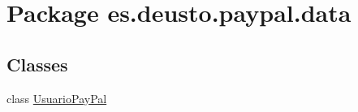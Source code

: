 \hypertarget{namespacees_1_1deusto_1_1paypal_1_1data}{}\section{Package es.\+deusto.\+paypal.\+data}
\label{namespacees_1_1deusto_1_1paypal_1_1data}
\subsection*{Classes}
\begin{DoxyCompactItemize}
\item 
class \mbox{\hyperlink{classes_1_1deusto_1_1paypal_1_1data_1_1_usuario_pay_pal}{Usuario\+Pay\+Pal}}
\end{DoxyCompactItemize}
